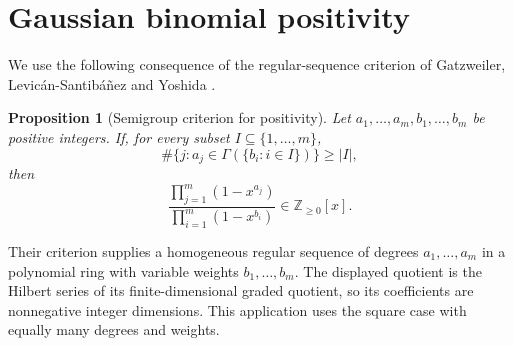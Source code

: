 \documentclass[11pt]{article}
\newtheorem{proposition}[theorem]{Proposition}
\theoremstyle{definition}
\theoremstyle{remark}
\newcommand{\ZZ}{\mathbb Z}
\newcommand{\Ga}{\Gamma}
\begin{document}
\section{Gaussian binomial positivity}\label{sec:GK}

We use the following consequence of the regular-sequence criterion of
Gatzweiler, Levic\'an-Santib\'a\~nez and Yoshida
\cite[Propositions~3.3 and~3.6]{GLY}.

\begin{proposition}[Semigroup criterion for positivity]\label{prop:GLY}
Let $a_1,\ldots,a_m,b_1,\ldots,b_m$ be positive integers. If, for every
subset $I\subseteq\{1,\ldots,m\}$,
\[
 \#\{j:a_j\in\Ga(\{b_i:i\in I\})\}\geq |I|,
\]
then
\[
 \frac{\prod_{j=1}^m(1-x^{a_j})}{\prod_{i=1}^m(1-x^{b_i})}
 \in\ZZ_{\geq0}[x].
\]
\end{proposition}

Their criterion supplies a homogeneous regular sequence of degrees
$a_1,\ldots,a_m$ in a polynomial ring with variable weights
$b_1,\ldots,b_m$. The displayed quotient is the Hilbert series of its
finite-dimensional graded quotient, so its coefficients are nonnegative
integer dimensions. This application uses the square case with equally
many degrees and weights.
\end{document}
